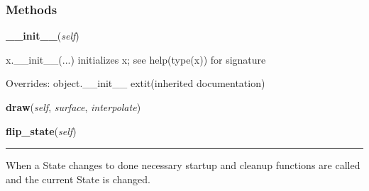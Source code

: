   \subsubsection{Methods}

    \vspace{0.5ex}

\hspace{.8\funcindent}\begin{boxedminipage}{\funcwidth}

    \raggedright \textbf{\_\_init\_\_}(\textit{self})

\setlength{\parskip}{2ex}
    x.\_\_init\_\_(...) initializes x; see help(type(x)) for signature

\setlength{\parskip}{1ex}
      Overrides: object.\_\_init\_\_ 	extit{(inherited documentation)}

    \end{boxedminipage}

    \label{pygame-asteroids:state_machine:StateMachine:draw}

    \vspace{0.5ex}

\hspace{.8\funcindent}\begin{boxedminipage}{\funcwidth}

    \raggedright \textbf{draw}(\textit{self}, \textit{surface}, \textit{interpolate})

\setlength{\parskip}{2ex}
\setlength{\parskip}{1ex}
    \end{boxedminipage}

    \label{pygame-asteroids:state_machine:StateMachine:flip_state}

    \vspace{0.5ex}

\hspace{.8\funcindent}\begin{boxedminipage}{\funcwidth}

    \raggedright \textbf{flip\_state}(\textit{self})

    \vspace{-1.5ex}

    \rule{\textwidth}{0.5\fboxrule}
\setlength{\parskip}{2ex}
    When a State changes to done necessary startup and cleanup functions 
    are called and the current State is changed.

\setlength{\parskip}{1ex}
    \end{boxedminipage}

